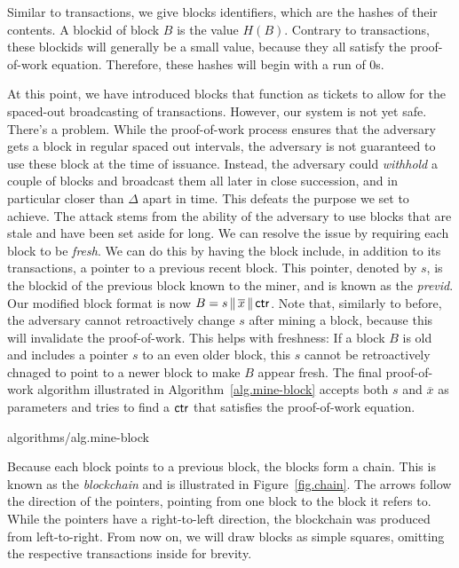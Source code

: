 Similar to transactions, we give blocks identifiers, which are the hashes of their contents.
A blockid of block $B$ is the value $H(B)$. Contrary to transactions, these blockids will
generally be a small value, because they all satisfy the proof-of-work equation. Therefore,
these hashes will begin with a run of $0$s.

At this point, we have introduced blocks that function as tickets to allow for the spaced-out
broadcasting of transactions. However, our system is not yet safe. There's a problem. While
the proof-of-work process ensures that the adversary gets a block in regular spaced out
intervals, the adversary is not guaranteed to use these block at the time of issuance.
Instead, the adversary could \emph{withhold} a couple of blocks and broadcast them all later
in close succession, and in particular closer than $\Delta$ apart in time. This defeats the
purpose we set to achieve. The attack stems from the ability of the adversary to use blocks
that are stale and have been set aside for long. We can resolve the issue by requiring
each block to be \emph{fresh}. We can do this by having the block include, in addition to
its transactions, a pointer to a previous recent block. This pointer, denoted by $s$,
is the blockid of the previous block known to the miner, and is known as the \emph{previd}.
Our modified block format is now $B = s \,\|\, \overline{x} \,\|\, \mathsf{ctr}$. Note that,
similarly to before, the adversary cannot retroactively change $s$ after mining a block,
because this will invalidate the proof-of-work. This helps with freshness: If a block $B$ is
old and includes a pointer $s$ to an even older block, this $s$ cannot be retroactively
chnaged to point to a newer block to make $B$ appear fresh. The final proof-of-work algorithm
illustrated in Algorithm~\ref{alg.mine-block}
accepts both $s$ and $\overline{x}$ as parameters and tries to find a $\mathsf{ctr}$ that
satisfies the proof-of-work equation.

{algorithms/alg.mine-block}

Because each block points to a previous block, the blocks form a chain. This is known
as the \emph{blockchain} and is illustrated in Figure~\ref{fig.chain}.
The arrows follow the direction of the pointers, pointing from one block to the block
it refers to. While the pointers have a right-to-left direction, the blockchain was
produced from left-to-right. From now on, we will draw blocks as simple squares,
omitting the respective transactions inside for brevity.


